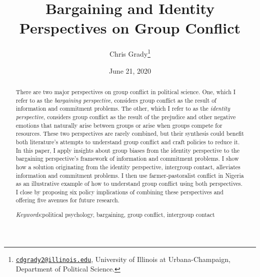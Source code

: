 \documentclass[11pt]{article}
\title{Bargaining and Identity Perspectives on Group Conflict}
\author{\parbox{.7\linewidth}{\centering
Chris Grady\thanks{\href{mailto:cdgrady2@illinois.edu}{\nolinkurl{cdgrady2@illinois.edu}},
University of Illinois at Urbana-Champaign, Department of Political
Science.} \quad
}
}
\date{June 21, 2020}
\begin{document}
\VerbatimFootnotes

%
%
%
%
%
%
%
%
%
%


\maketitle

\begin{abstract}\singlespacing\noindent
There are two major perspectives on group conflict in political science.
One, which I refer to as the \emph{bargaining perspective}, considers
group conflict as the result of information and commitment problems. The
other, which I refer to as the \emph{identity perspective}, considers
group conflict as the result of the prejudice and other negative
emotions that naturally arise between groups or arise when groups
compete for resources. These two perspectives are rarely combined, but
their synthesis could benefit both literature's attempts to understand
group conflict and craft policies to reduce it. In this paper, I apply
insights about group biases from the identity perspective to the
bargaining perspective's framework of information and commitment
problems. I show how a solution originating from the identity
perspective, intergroup contact, alleviates information and commitment
problems. I then use farmer-pastoralist conflict in Nigeria as an
illustrative example of how to understand group conflict using both
perspectives. I close by proposing six policy implications of combining
these perspectives and offering five avenues for future research.
\\ \par\noindent\emph{Keywords}:political psychology, bargaining, group conflict, intergroup contact\par
\end{abstract}
\end{document}
